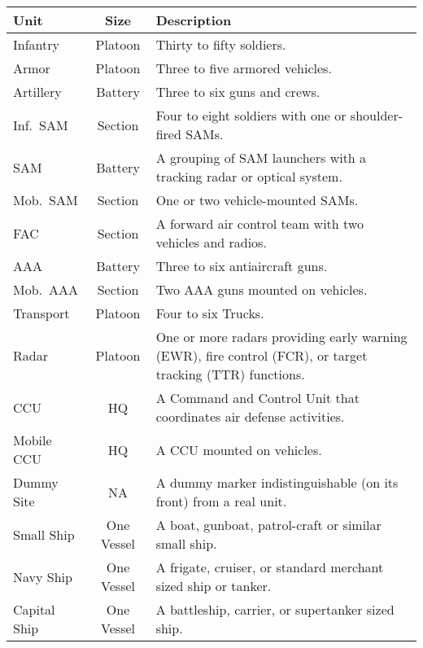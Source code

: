 
\begin{onecolumntablefloat}
\begin{onecolumntable}

\begin{tabularx}{\linewidth}{lcP}
\toprule
Unit&Size&Description\\
\midrule
Infantry        &Platoon    &Thirty to fifty soldiers.\\
Armor           &Platoon    &Three to five armored vehicles.\\
Artillery	    &Battery	&Three to six guns and crews.\\
Inf.\ SAM	    &Section	&Four to eight soldiers with one or shoulder-fired SAMs.\\
SAM	            &Battery    &A grouping of SAM launchers with a tracking radar or optical system.\\
Mob.\ SAM	    &Section	&One or two vehicle-mounted SAMs.\\
FAC	            &Section	&A forward air control team with two vehicles and radios.\\
AAA	            &Battery	&Three to six antiaircraft guns.\\
Mob.\ AAA	    &Section	&Two AAA guns mounted on vehicles.\\
Transport	    &Platoon	&Four to six Trucks.\\
Radar	        &Platoon	&One or more radars providing early warning (EWR), fire control (FCR), or target tracking (TTR) functions.\\
CCU	            &HQ	        &A Command and Control Unit that coordinates air defense activities.\\
Mobile CCU	    &HQ	        &A CCU mounted on vehicles.\\
Dummy Site	    &NA	        &A dummy marker indistinguishable (on its front) from a real unit.\\
Small Ship	    &One Vessel	&A boat, gunboat, patrol-craft or similar small ship.\\
Navy Ship	    &One Vessel	&A frigate, cruiser, or standard merchant sized ship or tanker.\\
Capital Ship	&One Vessel	&A battleship, carrier, or supertanker sized ship.\\
\bottomrule
\end{tabularx}

\end{onecolumntable}
\end{onecolumntablefloat}


